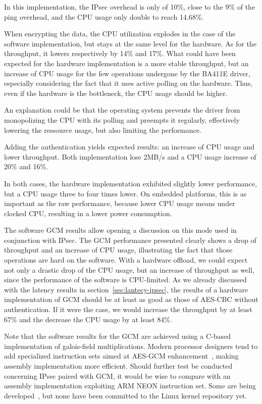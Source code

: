 In this implementation, the IPsec overhead is only of 10\%, close to the 9\% of the ping overhead, and the CPU usage only double to reach 14.68\%.

When encrypting the data, the CPU utilization explodes in the case of the software implementation, but stays at the same level for the hardware.
As for the throughput, it lowers respectively by 14\% and 17\%.
What could have been expected for the hardware implementation is a more stable throughput, but an increase of CPU usage for the few operations undergone by the BA411E driver, especially considering the fact that it uses active polling on the hardware.
Thus, even if the hardware is the bottleneck, the CPU usage should be higher.

\noindent An explanation could be that the operating system prevents the driver from monopolizing the CPU with its polling and preempts it regularly, effectively lowering the ressource usage, but also limiting the performance.

Adding the authentication yields expected results: an increase of CPU usage and lower throughput.
Both implementation lose 2MB/s and a CPU usage increase of 20\% and 16\%.

In both cases, the hardware implementation exhibited slightly lower performance, but a CPU usage three to four times lower.
On embedded platforms, this is as important as the raw performance, because lower CPU usage means under clocked CPU, resulting in a lower power consumption.\newline{}

The software GCM results allow opening a discussion on this mode used in conjunction with IPsec.
The GCM performance presented clearly shows a drop of throughput and an increase of CPU usage, illustrating the fact that those operations are hard on the software.
With a hardware offload, we could expect not only a drastic drop of the CPU usage, but an increase of throughput as well, since the performance of the software is CPU-limited.
As we already discussed with the latency results in section~\ref{sec:lantecy-ipsec}, the results of a hardware implementation of GCM should be at least as good as those of AES-CBC without authentication.
If it were the case, we would increase the throughput by at least 67\% and the decrease the CPU usage by at least 84\%.

Note that the software results for the GCM are achieved using a C-based implementation of galois-field multiplications.
Modern processor designers tend to add specialized instruction sets aimed at AES-GCM enhancement~\cite{intel-gcm2011}, making assembly implementation more efficient.
Should further test be conducted concerning IPsec paired with GCM, it would be wise to compare with an assembly implementation exploiting ARM NEON instruction set.
Some are being developed~\cite{Conrado2013,Danilo2013}, but none have been committed to the Linux kernel repository yet.


